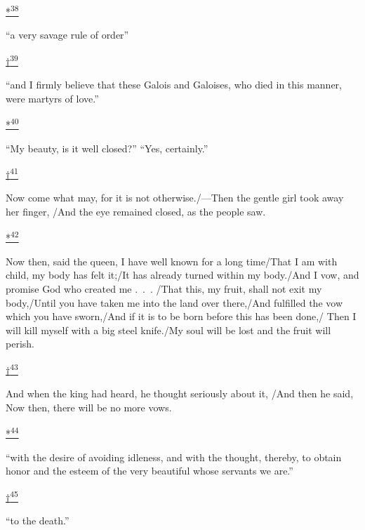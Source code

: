 \protect\hypertarget{23_NOTES.xhtmlux5cux23id_2538}{\protect\hyperlink{10_Chapter_Three__THE_HEROIC_DREAM.xhtmlux5cux23id_2537}{*\textsuperscript{38}}}
``a very savage rule of order''

\protect\hypertarget{23_NOTES.xhtmlux5cux23id_2540}{\protect\hyperlink{10_Chapter_Three__THE_HEROIC_DREAM.xhtmlux5cux23id_2539}{†\textsuperscript{39}}}
``and I firmly believe that these Galois and Galoises, who died in this
manner, were martyrs of love.''

\protect\hypertarget{23_NOTES.xhtmlux5cux23id_2542}{\protect\hyperlink{10_Chapter_Three__THE_HEROIC_DREAM.xhtmlux5cux23id_2541}{*\textsuperscript{40}}}
``My beauty, is it well closed?'' ``Yes, certainly.''

\protect\hypertarget{23_NOTES.xhtmlux5cux23id_2544}{\protect\hyperlink{10_Chapter_Three__THE_HEROIC_DREAM.xhtmlux5cux23id_2543}{†\textsuperscript{41}}}
Now come what may, for it is not otherwise./---Then the gentle girl took
away her finger, /And the eye remained closed, as the people saw.

\protect\hypertarget{23_NOTES.xhtmlux5cux23id_2872}{\protect\hyperlink{10_Chapter_Three__THE_HEROIC_DREAM.xhtmlux5cux23id_2871}{*\textsuperscript{42}}}
Now then, said the queen, I have well known for a long time/That I am
with child, my body has felt it;/It has already turned within my
body./And I vow, and promise God who created me .~.~. /That this, my
fruit, shall not exit my body,/Until you have taken me into the land
over there,/And fulfilled the vow which you have sworn,/And if it is to
be born before this has been done,/ Then I will kill myself with a big
steel knife./My soul will be lost and the fruit will perish.

\protect\hypertarget{23_NOTES.xhtmlux5cux23id_2874}{\protect\hyperlink{10_Chapter_Three__THE_HEROIC_DREAM.xhtmlux5cux23id_2873}{†\textsuperscript{43}}}
And when the king had heard, he thought seriously about it, /And then he
said, Now then, there will be no more vows.

\protect\hypertarget{23_NOTES.xhtmlux5cux23id_2876}{\protect\hyperlink{10_Chapter_Three__THE_HEROIC_DREAM.xhtmlux5cux23id_2875}{*\textsuperscript{44}}}
``with the desire of avoiding idleness, and with the thought, thereby,
to obtain honor and the esteem of the very beautiful whose servants we
are.''

\protect\hypertarget{23_NOTES.xhtmlux5cux23id_2878}{\protect\hyperlink{10_Chapter_Three__THE_HEROIC_DREAM.xhtmlux5cux23id_2877}{†\textsuperscript{45}}}
``to the death.''

